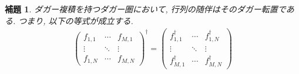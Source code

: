 \documentclass[a4paper,12pt]{ltjsarticle}
\theoremstyle{break}
\newtheorem{lem}[thm]{補題}
\newcommand{\da}{\dagger}
\numberwithin{equation}{section}
\begin{document}
\begin{lem}
  ダガー複積を持つダガー圏において, 行列の随伴はそのダガー転置である. 
  つまり, 以下の等式が成立する. 
  \begin{align*} 
      \begin{pmatrix}
      f_{1,1} & \cdots & f_{M,1} \\
      \vdots & \ddots & \vdots \\
      f_{1,N} & \cdots  & f_{M,N}
      \end{pmatrix}^\da
    = 
    \begin{pmatrix}
      f_{1,1}^\da & \cdots & f_{1,N}^\da \\
      \vdots & \ddots & \vdots \\
      f_{M,1}^\da & \cdots  & f_{M,N}^\da
    \end{pmatrix}
  \end{align*}
\end{lem}
\end{document}
